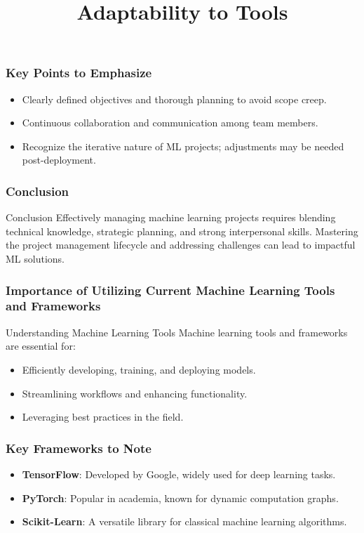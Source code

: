 \documentclass[aspectratio=169]{beamer}
\begin{document}
\begin{frame}[fragile]
    \frametitle{Key Points to Emphasize}
    \begin{itemize}
        \item Clearly defined objectives and thorough planning to avoid scope creep.
        \item Continuous collaboration and communication among team members.
        \item Recognize the iterative nature of ML projects; adjustments may be needed post-deployment.
    \end{itemize}
\end{frame}

\begin{frame}[fragile]
    \frametitle{Conclusion}
    \begin{block}{Conclusion}
        Effectively managing machine learning projects requires blending technical knowledge, strategic planning, and strong interpersonal skills. Mastering the project management lifecycle and addressing challenges can lead to impactful ML solutions.
    \end{block}
\end{frame}

\begin{frame}
    \title{Adaptability to Tools}
    \maketitle
\end{frame}

\begin{frame}
    \frametitle{Importance of Utilizing Current Machine Learning Tools and Frameworks}
    
    \begin{block}{Understanding Machine Learning Tools}
        Machine learning tools and frameworks are essential for:
        \begin{itemize}
            \item Efficiently developing, training, and deploying models.
            \item Streamlining workflows and enhancing functionality.
            \item Leveraging best practices in the field.
        \end{itemize}
    \end{block}
\end{frame}

\begin{frame}
    \frametitle{Key Frameworks to Note}
    
    \begin{itemize}
        \item \textbf{TensorFlow}: Developed by Google, widely used for deep learning tasks.
        \item \textbf{PyTorch}: Popular in academia, known for dynamic computation graphs.
        \item \textbf{Scikit-Learn}: A versatile library for classical machine learning algorithms.
    \end{itemize}
\end{frame}
\end{document}
